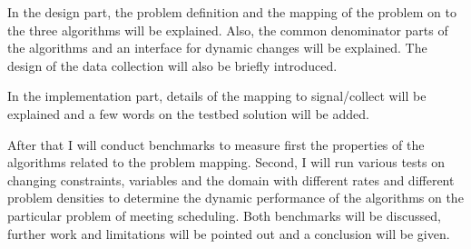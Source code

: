 In the design part, the problem definition and the mapping of the problem on to the three algorithms will be explained. Also, the common denominator parts of the algorithms and an interface for dynamic changes will be explained. The design of the data collection will also be briefly introduced.

In the implementation part, details of the mapping to signal/collect will be explained and a few words on the testbed solution will be added.

After that I will conduct benchmarks to measure first the properties of the algorithms related to the problem mapping. Second, I will run various tests on changing constraints, variables and the domain with different rates and different problem densities to determine the dynamic performance of the algorithms on the particular problem of meeting scheduling. Both benchmarks will be discussed, further work and limitations will be pointed out and a conclusion will be given.